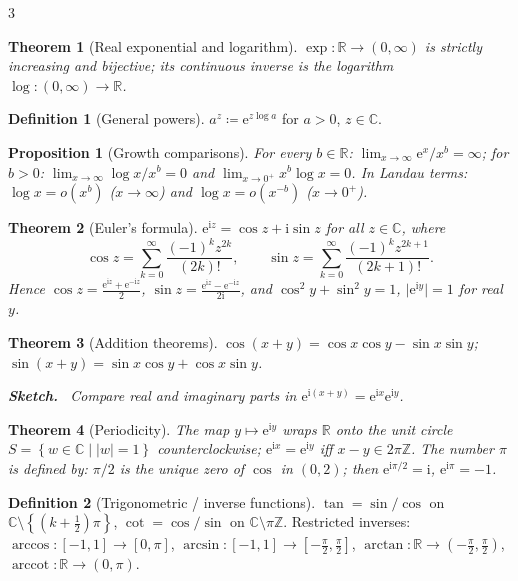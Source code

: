 \documentclass[10pt,a4paper,landscape]{article}
\theoremstyle{definition}
\newtheorem{defn}{Definition}[section]
\theoremstyle{plain}
\newtheorem{thm}{Theorem}[section]
\newtheorem{prop}{Proposition}[section]
\theoremstyle{remark}
\newcommand{\R}{\mathbb{R}}
\newcommand{\Z}{\mathbb{Z}}
\newcommand{\C}{\mathbb{C}}
\newcommand{\e}{\mathrm{e}}
\newcommand{\abs}[1]{\lvert #1 \rvert}
\newcommand{\set}[1]{\left\{ #1 \right\}}
\newcommand{\oo}{\infty}
\newcommand{\deq}{\coloneqq}
\DeclareMathOperator{\arccot}{arccot}
\newenvironment{proofsketch}{%
  \par\small\color{exgray}\textbf{Sketch.}\ }%
  {\par}
\begin{document}
\begin{multicols*}{3}
\begin{thm}[Real exponential and logarithm]
$\exp: \R \to (0,\oo)$ is strictly increasing and bijective; its continuous inverse is the \emph{logarithm} $\log: (0,\oo) \to \R$.
\end{thm}

\begin{defn}[General powers]
$a^z \deq \e^{z \log a}$ for $a > 0$, $z \in \C$.
\end{defn}

\begin{prop}[Growth comparisons]
For every $b \in \R$: $\lim_{x \to \oo} \e^x / x^b = \oo$; for $b>0$: $\lim_{x \to \oo} \log x / x^b = 0$ and $\lim_{x \to 0^+} x^b \log x = 0$. In Landau terms: $\log x = o(x^b)$ ($x\to\oo$) and $\log x = o(x^{-b})$ ($x \to 0^+$).
\end{prop}

\begin{thm}[Euler's formula]
$\e^{\mathrm{i} z} = \cos z + \mathrm{i} \sin z$ for all $z \in \C$, where
\[
\cos z = \sum_{k=0}^{\oo} \frac{(-1)^k z^{2k}}{(2k)!}, \qquad
\sin z = \sum_{k=0}^{\oo} \frac{(-1)^k z^{2k+1}}{(2k+1)!}.
\]
Hence $\cos z = \frac{\e^{\mathrm{i}z} + \e^{-\mathrm{i}z}}{2}$, $\sin z = \frac{\e^{\mathrm{i}z} - \e^{-\mathrm{i}z}}{2\mathrm{i}}$, and $\cos^2 y + \sin^2 y = 1$, $\abs{\e^{\mathrm{i} y}} = 1$ for real $y$.
\end{thm}

\begin{thm}[Addition theorems]
$\cos(x+y) = \cos x \cos y - \sin x \sin y$; $\sin(x+y) = \sin x \cos y + \cos x \sin y$.
\begin{proofsketch}
Compare real and imaginary parts in $\e^{\mathrm{i}(x+y)} = \e^{\mathrm{i}x}\e^{\mathrm{i}y}$.
\end{proofsketch}
\end{thm}

\begin{thm}[Periodicity]
The map $y \mapsto \e^{\mathrm{i} y}$ wraps $\R$ onto the unit circle $S = \set{w \in \C \mid \abs{w} = 1}$ counterclockwise; $\e^{\mathrm{i}x} = \e^{\mathrm{i}y}$ iff $x - y \in 2\pi \Z$. The number $\pi$ is defined by: $\pi/2$ is the unique zero of $\cos$ in $(0,2)$; then $\e^{\mathrm{i}\pi/2} = \mathrm{i}$, $\e^{\mathrm{i}\pi} = -1$.
\end{thm}

\begin{defn}[Trigonometric / inverse functions]
$\tan = \sin/\cos$ on $\C \setminus \set{(k+\frac{1}{2})\pi}$, $\cot = \cos/\sin$ on $\C \setminus \pi\Z$. Restricted inverses: $\arccos: [-1,1] \to [0,\pi]$, $\arcsin: [-1,1] \to [-\frac{\pi}{2},\frac{\pi}{2}]$, $\arctan: \R \to (-\frac{\pi}{2},\frac{\pi}{2})$, $\arccot: \R \to (0,\pi)$.
\end{defn}


\end{multicols*}
\end{document}
